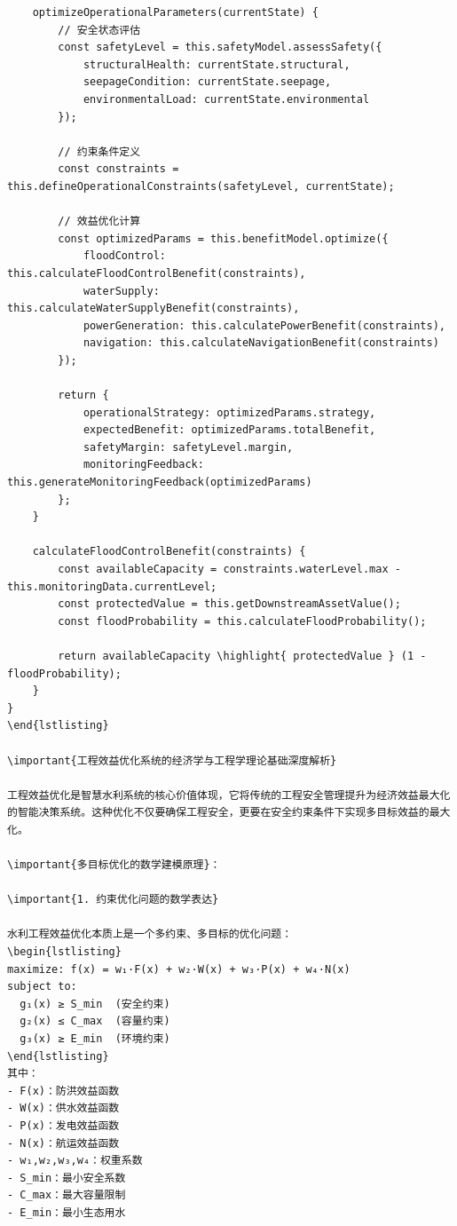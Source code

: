 \begin{verbatim}
    optimizeOperationalParameters(currentState) {
        // 安全状态评估
        const safetyLevel = this.safetyModel.assessSafety({
            structuralHealth: currentState.structural,
            seepageCondition: currentState.seepage,
            environmentalLoad: currentState.environmental
        });
        
        // 约束条件定义
        const constraints = this.defineOperationalConstraints(safetyLevel, currentState);
        
        // 效益优化计算
        const optimizedParams = this.benefitModel.optimize({
            floodControl: this.calculateFloodControlBenefit(constraints),
            waterSupply: this.calculateWaterSupplyBenefit(constraints),
            powerGeneration: this.calculatePowerBenefit(constraints),
            navigation: this.calculateNavigationBenefit(constraints)
        });
        
        return {
            operationalStrategy: optimizedParams.strategy,
            expectedBenefit: optimizedParams.totalBenefit,
            safetyMargin: safetyLevel.margin,
            monitoringFeedback: this.generateMonitoringFeedback(optimizedParams)
        };
    }
    
    calculateFloodControlBenefit(constraints) {
        const availableCapacity = constraints.waterLevel.max - this.monitoringData.currentLevel;
        const protectedValue = this.getDownstreamAssetValue();
        const floodProbability = this.calculateFloodProbability();
        
        return availableCapacity \highlight{ protectedValue } (1 - floodProbability);
    }
}
\end{lstlisting}

\important{工程效益优化系统的经济学与工程学理论基础深度解析}

工程效益优化是智慧水利系统的核心价值体现，它将传统的工程安全管理提升为经济效益最大化的智能决策系统。这种优化不仅要确保工程安全，更要在安全约束条件下实现多目标效益的最大化。

\important{多目标优化的数学建模原理}：

\important{1. 约束优化问题的数学表达}

水利工程效益优化本质上是一个多约束、多目标的优化问题：
\begin{lstlisting}
maximize: f(x) = w₁·F(x) + w₂·W(x) + w₃·P(x) + w₄·N(x)
subject to:
  g₁(x) ≥ S_min  (安全约束)
  g₂(x) ≤ C_max  (容量约束)
  g₃(x) ≥ E_min  (环境约束)
\end{lstlisting}
其中：
- F(x)：防洪效益函数
- W(x)：供水效益函数  
- P(x)：发电效益函数
- N(x)：航运效益函数
- w₁,w₂,w₃,w₄：权重系数
- S_min：最小安全系数
- C_max：最大容量限制
- E_min：最小生态用水


\end{verbatim}
